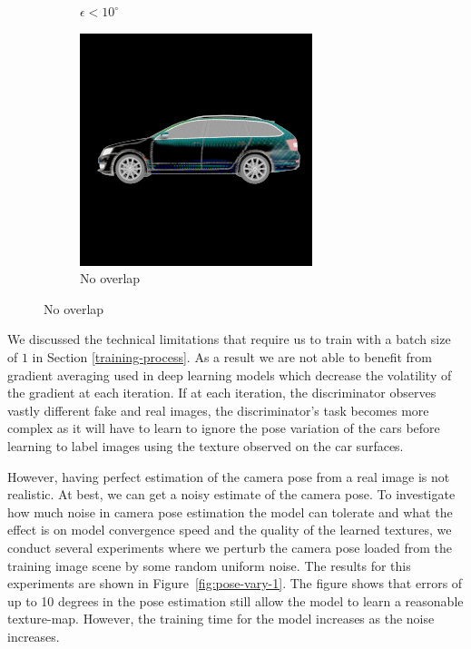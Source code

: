 \begin{figure}
\begin{subfigure}[t]{0.19\linewidth}
        \caption{$\epsilon < 10^\circ$}
    \end{subfigure}
    \begin{subfigure}[t]{0.19\linewidth}
        \centering
        \includegraphics[width=\linewidth]{graphics/pose_diff.png}
        \caption{No overlap}
    \end{subfigure}
\end{figure}

We discussed the technical limitations that require us to train with a batch size of $1$
in Section \ref{training-process}. As a result we are not able to benefit from gradient averaging
used in deep learning models which decrease the volatility of the gradient at each iteration. If
at each iteration, the discriminator observes vastly different fake and real images, the
discriminator's task becomes more complex as it will have to learn to ignore the pose variation
of the cars before learning to label images using the texture observed on the car surfaces.

However, having perfect estimation of the camera pose from a real image is not realistic. At
best, we can get a noisy estimate of the camera pose. To investigate how much noise in camera
pose estimation the model can tolerate and what the effect is on model convergence speed and
the quality of the learned textures, we conduct several experiments where we perturb the camera
pose loaded from the training image scene by some random uniform noise. The results for this
experiments are shown in Figure~\ref{fig:pose-vary-1}. The figure shows that errors of up to 10
degrees in the pose estimation still allow the model to learn a reasonable texture-map. However,
the training time for the model increases as the noise increases.

